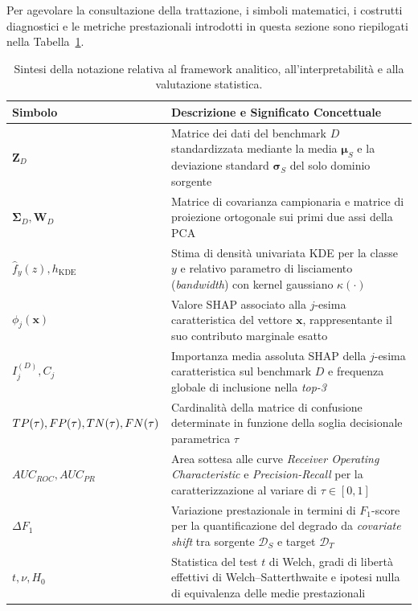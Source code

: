 Per agevolare la consultazione della trattazione, i simboli matematici, i costrutti diagnostici e le metriche prestazionali introdotti in questa sezione sono riepilogati nella Tabella~\ref{tab:notazione_framework}.

\begin{table}[H]
    \centering
    \caption{Sintesi della notazione relativa al framework analitico, all'interpretabilità e alla valutazione statistica.}
    \label{tab:notazione_framework}
    \begin{tabularx}{\textwidth}{l >{\raggedright\arraybackslash}X }
    \toprule
    \textbf{Simbolo} & \textbf{Descrizione e Significato Concettuale} \\
    \midrule
    $\mathbf{Z}_D$ &
    Matrice dei dati del benchmark $D$ standardizzata mediante la media $\boldsymbol{\mu}_S$ e la deviazione standard $\boldsymbol{\sigma}_S$ del solo dominio sorgente \\
    $\boldsymbol{\Sigma}_D, \mathbf{W}_D$ &
    Matrice di covarianza campionaria e matrice di proiezione ortogonale sui primi due assi della PCA \\
    $\hat{f}_y(z), h_{\text{KDE}}$ &
    Stima di densità univariata KDE per la classe $y$ e relativo parametro di lisciamento (\textit{bandwidth}) con kernel gaussiano $\kappa(\cdot)$ \\
    $\phi_j(\mathbf{x})$ &
    Valore SHAP associato alla $j$-esima caratteristica del vettore $\mathbf{x}$, rappresentante il suo contributo marginale esatto \\
    $I_j^{(D)}, C_j$ &
    Importanza media assoluta SHAP della $j$-esima caratteristica sul benchmark $D$ e frequenza globale di inclusione nella \textit{top-3} \\
    $TP(\tau), FP(\tau), \newline TN(\tau), FN(\tau)$ &
    Cardinalità della matrice di confusione determinate in funzione della soglia decisionale parametrica $\tau$ \\
    $AUC_{ROC}, AUC_{PR}$ &
    Area sottesa alle curve \textit{Receiver Operating Characteristic} e \textit{Precision-Recall} per la caratterizzazione al variare di $\tau \in [0,1]$ \\
    $\Delta F_1$ &
    Variazione prestazionale in termini di $F_1$-score per la quantificazione del degrado da \textit{covariate shift} tra sorgente $\mathcal{D}_S$ e target $\mathcal{D}_T$ \\
    $t, \nu, H_0$ &
    Statistica del test $t$ di Welch, gradi di libertà effettivi di Welch--Satterthwaite e ipotesi nulla di equivalenza delle medie prestazionali \\
    \bottomrule
    \end{tabularx}
\end{table}

